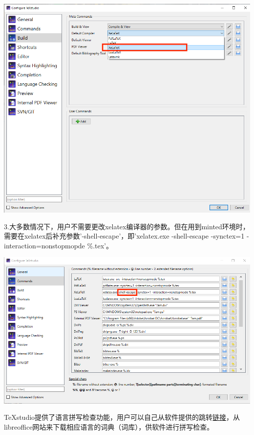 \documentclass[12pt]{book}
\begin{document}
\begin{center}
	\includegraphics[scale=0.8]{./texstudio-build.png}
\end{center}
3.大多数情况下，用户不需要更改xelatex编译器的参数。但在用到minted环境时，需要在xelatex后补充参数'-shell-escape'，即'xelatex.exe -shell-escape -synctex=1 -interaction=nonstopmopde \%.tex'。


\begin{center}
	\includegraphics[scale=0.65]{./texstudio-command.png}
\end{center}
TeXstudio提供了语言拼写检查功能，用户可以自己从软件提供的跳转\href{https://extensions.libreoffice.org/}{链接}，从libreoffice网站来下载相应语言的词典（词库），供软件进行拼写检查。
\end{document}
